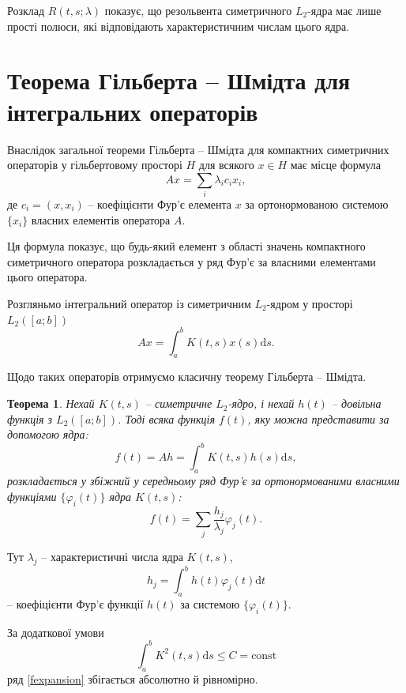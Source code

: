 \documentclass[14pt,twoside]{extreport}
\theoremstyle{mystyle}
\newtheorem{thm}{Теорема}
\numberwithin{equation}{chapter}
\begin{document}
Розклад $R(t, s; \lambda)$ показує, що резольвента симетричного $L_2$-ядра має лише прості полюси, які відповідають характеристичним числам цього ядра.

\section{Теорема Гільберта -- Шмідта для інтегральних операторів}

Внаслідок загальної теореми Гільберта -- Шмідта для компактних симетричних операторів у гільбертовому просторі $H$ для всякого $x \in H$ має місце формула
\[
 Ax=\sum_{i} \lambda_i c_i x_i,
\]
де $c_i = (x, x_i)$ -- коефіцієнти Фур'є елемента $x$ за ортонормованою системою $\{x_i\}$ власних елементів оператора $A$.

Ця формула показує, що будь-який елемент з області значень компактного симетричного оператора розкладається у ряд Фур'є за власними елементами цього оператора.

Розгляньмо інтегральний оператор із симетричним $L_2$-ядром у просторі $L_2([a; b])$
\[
 Ax = \int_{a}^{b} K(t, s) x(s) \mathrm{d}s.
\]

Щодо таких операторів отримуємо класичну теорему Гільберта -- Шмідта.
\begin{thm}
	Нехай $K(t, s)$ -- симетричне $L_2$-ядро, і нехай $h(t)$ -- довільна функція з $L_2([a; b])$. Тоді всяка функція $f(t)$, яку можна представити за допомогою ядра:
	\[
	f(t) = A h = \int_{a}^{b} K(t, s) h(s) \mathrm{d}s,
	\]
	розкладається у збіжний у середньому ряд Фур'є за ортонормованими власними функціями $\{\varphi_i(t)\}$ ядра $K(t, s)$:
	\begin{equation}\label{fexpansion}
	f(t) = \sum_{j} \frac{h_j}{\lambda_j} \varphi_j(t).
	\end{equation}
\end{thm}

Тут $\lambda_j$ -- характеристичні числа ядра $K(t, s)$,
\[
h_j = \int_{a}^{b} h(t) \varphi_j(t) \mathrm{d}t
\]
-- коефіцієнти Фур'є функції $h(t)$ за системою $\{\varphi_i(t)\}$.

За додаткової умови
\[
\int_{a}^{b} K^2(t, s) \mathrm{d}s \leqslant C = \textrm{const}
\]
ряд \eqref{fexpansion} збігається абсолютно й рівномірно.
\end{document}
